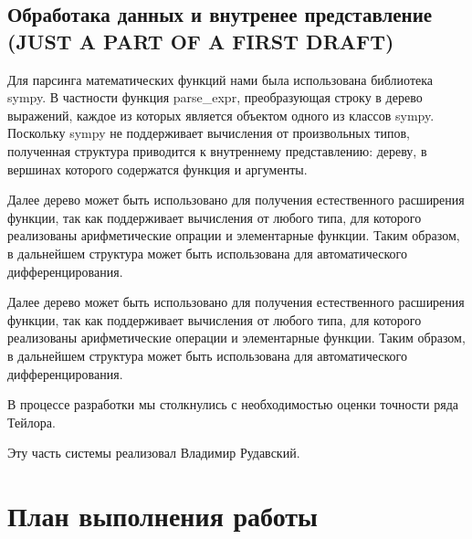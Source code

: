 \documentclass[a4paper,12pt]{extarticle}
\begin{document}
\subsection*{Обработака данных и внутренее представление (JUST A PART OF A FIRST DRAFT)}
Для парсинга математических функций нами была использована библиотека sympy. В частности функция parse\_expr, преобразующая строку в дерево выражений, каждое из которых является объектом одного из классов sympy. Поскольку sympy не поддерживает вычисления от произвольных типов, полученная структура приводится к внутреннему представлению: дереву, в вершинах которого содержатся функция и аргументы.


Далее дерево может быть использовано для получения естественного расширения функции, так как поддерживает вычисления от любого типа, для которого реализованы арифметические опрации и элементарные функции. Таким образом, в дальнейшем структура может быть использована для автоматического дифференцирования.

Далее дерево может быть использовано для получения естественного расширения функции, так как поддерживает вычисления от любого типа, для которого реализованы арифметические операции и элементарные функции. Таким образом, в дальнейшем структура может быть использована для автоматического дифференцирования.

В процессе разработки мы столкнулись с необходимостью оценки точности ряда Тейлора. 

Эту часть системы реализовал Владимир Рудавский.

\section{План выполнения работы}
\end{document}
